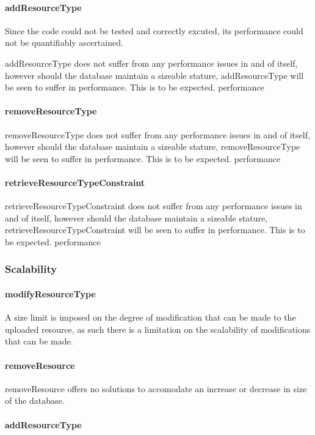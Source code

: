 \documentclass[a4paper]{article}
\begin{document}
\paragraph{addResourceType}

Since the code could not be tested and correctly excuted, its performance could not be quantifiably ascertained.

addResourceType does not suffer from any performance issues in and of itself, however should the database maintain a sizeable stature, addResourceType will be seen to suffer in performance. This is to be expected.
performance

\paragraph{removeResourceType}
removeResourceType does not suffer from any performance issues in and of itself, however should the database maintain a sizeable stature, removeResourceType will be seen to suffer in performance. This is to be expected.
performance

\paragraph{retrieveResourceTypeConstraint}
retrieveResourceTypeConstraint does not suffer from any performance issues in and of itself, however should the database maintain a sizeable stature, retrieveResourceTypeConstraint will be seen to suffer in performance. This is to be expected.
performance


\subsubsection {Scalability}

\paragraph{modifyResourceType}
A size limit is imposed on the degree of modification that can be made to the uploaded resource, as such there is a limitation on the scalability of modifications that can be made.

\paragraph{removeResource}
removeResource offers no solutions to accomodate an increase or decrease in size of the database.

\paragraph{addResourceType}
\end{document}
